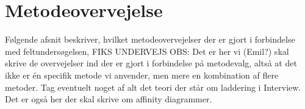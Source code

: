 \section{Metodeovervejelse}
\label{ParametreMetodeovervejelser}
%
Følgende afsnit beskriver, hvilket metodeovervejelser der er gjort i forbindelse med feltundersøgelsen, FIKS UNDERVEJS\blankline
%
OBS: Det er her vi (Emil?) skal skrive de overvejelser ind der er gjort i forbindelse på metodevalg, altså at det ikke er én specifik metode vi anvender, men mere en kombination af flere metoder. Tag eventuelt noget af alt det teori der står om laddering i Interview. Det er også her der skal skrive om affinity diagrammer.\blankline
% 

